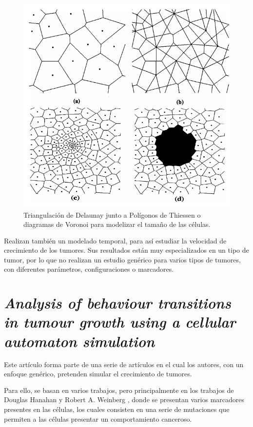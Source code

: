 \begin{figure}[h]
\centering
\includegraphics[scale=0.7]{figures/modelado_tamanio}
\caption{Triangulación de Delaunay junto a Polígonos de Thiessen o diagramas de Voronoi para modelizar el tamaño de las células.}
\label{fig:delaunay}
\end{figure}

\newpage

Realizan también un modelado temporal, para así estudiar la velocidad de crecimiento de los tumores.
Sus resultados están muy especializados en un tipo de tumor, por lo que no realizan un estudio genérico
para varios tipos de tumores, con diferentes parámetros, configuraciones o marcadores.

\section{\textit{Analysis of behaviour transitions in tumour growth
using a cellular automaton simulation}}

Este artículo \cite{jsantos-amonteagudo-1-2014} forma parte de una serie de artículos
\cite{jsantos-amonteagudo-2012} \cite{jsantos-amonteagudo-2013} \cite{jsantos-amonteagudo-2015}
en el cual los autores, con un enfoque genérico, pretenden simular el crecimiento de
tumores.

Para ello, se basan en varios trabajos, pero principalmente en los trabajos de Douglas Hanahan y Robert A. Weinberg
\cite{hanahan-weinberg-2000} \cite{hanahan-weinberg-2011}, donde se presentan varios marcadores presentes
en las células, los cuales consisten en una serie de mutaciones que permiten a las células presentar
un comportamiento canceroso.

